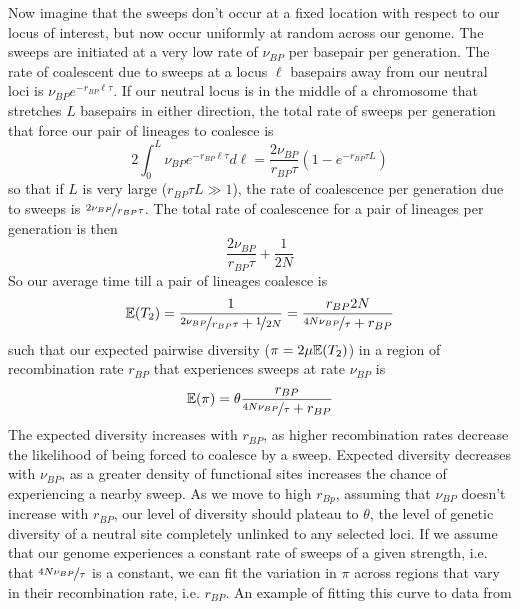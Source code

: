 Now imagine that the sweeps don't occur at a fixed location with
respect to our locus of interest, but now occur uniformly at random
across our genome. The sweeps are initiated at a very low rate of
$\nu_{BP}$ per basepair per generation. The rate of coalescent due to
sweeps at a locus $\ell$ basepairs away from our neutral loci is
$\nu_{BP} e^{-r_{BP} \ell \tau}$. If our neutral locus is in the
middle of a chromosome that stretches $L$ basepairs in either direction,
the total rate of sweeps per generation that force our pair of lineages to coalesce is
\begin{equation}
2\int_0^{L} \nu_{BP} e^{-r_{BP} \ell \tau} d \ell =
\frac{2\nu_{BP}}{r_{BP} \tau} \left(1-e^{-r_{BP} \tau L} \right)
\end{equation}
so that if $L$ is very large ($r_{BP} \tau L \gg 1$), the rate of coalescence per
generation due to sweeps is $\nicefrac{2\nu_{BP}}{r_{BP} \tau}$. The total rate
of coalescence for a pair of lineages per generation is then
\begin{equation}
\frac{2\nu_{BP}}{r_{BP} \tau}+\frac{1}{2N}
\end{equation}
So our average time till a pair of lineages coalesce is
\begin{equation}
\mathbb{E}(T_2) = \frac{1}{\nicefrac{2\nu_{BP}}{r_{BP} \tau}+\nicefrac{1}{2N}} = \frac{r_{BP}2N}{\nicefrac{4N\nu_{BP}}{ \tau}+r_{BP}}
\end{equation}
such that our expected pairwise diversity ($\pi=2\mu\mathbb{E}(T_2)$) in a region of
recombination rate $r_{BP}$ that experiences sweeps at rate $\nu_{BP}$
is  
\begin{equation}
\mathbb{E}(\pi) = \theta \frac{r_{BP}}{\nicefrac{4N\nu_{BP}}{ \tau}+r_{BP}} \label{eqn:pi_GW_HH}
\end{equation}
The expected diversity increases with $r_{BP}$, as higher
recombination rates decrease the likelihood of being forced to
coalesce by a sweep. Expected diversity decreases with $\nu_{BP}$, as
a greater density of functional sites increases the chance of
experiencing a nearby sweep. As we move to high $r_{Bp}$, assuming
that $\nu_{BP}$ doesn't increase with $r_{BP}$, our level of diversity
should plateau to $\theta$, the level of genetic diversity of a
neutral site completely unlinked to any selected loci. If we assume
that our genome experiences a constant rate of sweeps of a given
strength, i.e. that $\nicefrac{4N\nu_{BP}}{ \tau}$ is a constant, we can fit the
variation in $\pi$ across regions that vary in their recombination
rate, i.e. $r_{BP}$.  An example of fitting this curve to data from
